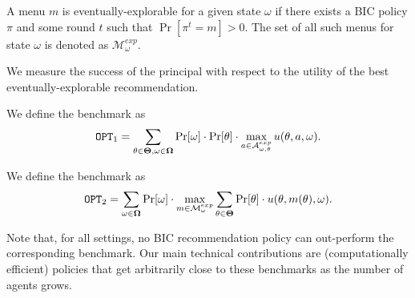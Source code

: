 \documentclass[11pt]{article}
\newcommand{\term}[1]{\ensuremath{\mathtt{#1}}}
\def\A{\mathcal{A}}
\def\M{\mathcal{M}}
\def\OPT{\term{OPT}}
\def\varTheta{\bold{\Theta}}
\def\varOmega{\bold{\Omega}}
\begin{document}
\begin{definition}
	A menu $m$ is eventually-explorable for a given state $\omega$ if there exists a BIC policy $\pi$ and some round $t$ such that $\Pr[\pi^t= m]> 0$. The set of all such menus for state $\omega$ is denoted as $\M_{\omega}^{exp}$.
\end{definition}

We measure the success of the principal with respect to the utility of the best eventually-explorable recommendation.

\begin{definition}
	We define the benchmark as
	\[
	\OPT_1 = \sum_{\theta \in \varTheta, \omega\in \varOmega} \Pr[\omega] \cdot \Pr[\theta] \cdot \max_{a \in \A_{\omega,\theta}^{exp}} u(\theta, a, \omega).
	\]
\end{definition}

\begin{definition}
	We define the benchmark as 
	\[
	\OPT_2 = \sum_{\omega\in \varOmega} \Pr[\omega] \cdot\max_{m \in \M_{\omega}^{exp}}\sum_{\theta \in \varTheta} \Pr[\theta] \cdot  u(\theta, m(\theta), \omega).
	\]
\end{definition}

Note that, for all settings, no BIC recommendation policy can out-perform the corresponding benchmark.  Our main technical contributions are (computationally efficient) policies that get arbitrarily close to these benchmarks as the number of agents grows.












\appendix

\end{document}
